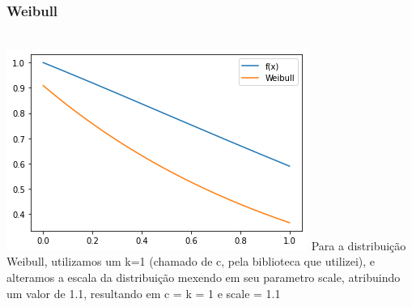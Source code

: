 \documentclass[twocolumn,amsmath,amssymb,floatfix]{revtex4}
\begin{document}
\subsubsection{Weibull}
\\\includegraphics[scale=0.65]{weibull_dist_graph.png}
\indent Para a distribuição Weibull, utilizamos um k=1 (chamado de c, pela biblioteca que utilizei), e alteramos a escala da distribuição mexendo em seu parametro scale, atribuindo um valor de 1.1, resultando em c = k = 1 e scale = 1.1
\end{document}
